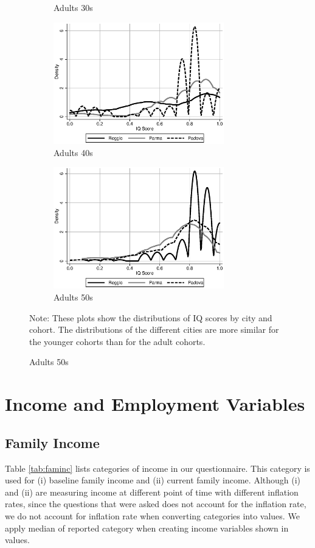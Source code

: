 \begin{figure}[H]
\begin{center}
\begin{subfigure}{.5\textwidth}
		\caption{Adults 30s}
	\end{subfigure}
	\begin{subfigure}{.5\textwidth}
		\centering
		\includegraphics[width=20em]{../../../../Output/IQ_hist_5}
		\caption{Adults 40s}
	\end{subfigure}%
	\begin{subfigure}{.5\textwidth}
		\centering
		\includegraphics[width=20em]{../../../../Output/IQ_hist_6}
		\caption{Adults 50s}
	\end{subfigure}
\end{center}
\raggedright \footnotesize
Note: These plots show the distributions of IQ scores by city and cohort. The distributions of the different cities are more similar for the younger cohorts than for the adult cohorts. 
\end{figure}


\section{Income and Employment Variables}
\label{sec:income}
\subsection{Family Income}

Table \ref{tab:faminc} lists categories of income in our questionnaire. This category is used for (i) baseline family income and (ii) current family income. Although (i) and (ii) are measuring income at different point of time with different inflation rates, since the questions that were asked does not account for the inflation rate, we do not account for inflation rate when converting categories into values. We apply median of reported category when creating income variables shown in values. 

